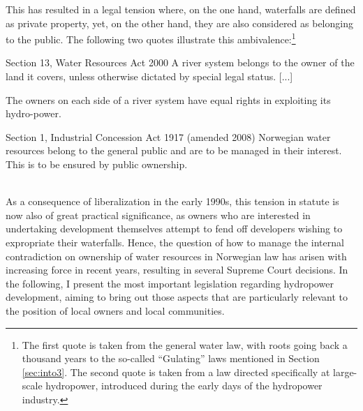 
This has resulted in a legal tension where, on the one hand, waterfalls are defined as private property, yet, on the other hand, they are also considered as belonging to the public. The following two quotes illustrate this ambivalence:\footnote{The first quote is taken from the general water law, with roots going back a thousand years to the so-called ``Gulating'' laws mentioned in Section \ref{sec:into3}. The second quote is taken from a law directed specifically at large-scale hydropower, introduced during the early days of the hydropower industry.}

{\begin{minipage}[t]{16em}
 \begin{aquote}{\tiny Section 13, Water Resources Act 2000} \footnotesize A river system belongs to the owner of the land it covers, unless otherwise dictated by special legal status. [...]

The owners on each side of a river system have equal rights in exploiting its hydro-power.
\end{aquote}  
\end{minipage}}
{\begin{minipage}[t]{22em}
\begin{aquote}{\tiny Section 1, Industrial Concession Act 1917 (amended 2008)} \footnotesize Norwegian water resources belong to the general public and are to be managed in their interest. This is to be ensured by public ownership.
\end{aquote}
\end{minipage}} \\

As a consequence of liberalization in the early 1990s, this tension in statute is now also of great practical significance, as owners who are interested in undertaking development themselves attempt to fend off developers wishing to expropriate their waterfalls. Hence, the question of how to manage the internal contradiction on ownership of water resources in Norwegian law has arisen with increasing force in recent years, resulting in several Supreme Court decisions. In the following, I present the most important legislation regarding hydropower development, aiming to bring out those aspects that are particularly relevant to the position of local owners and local communities.

